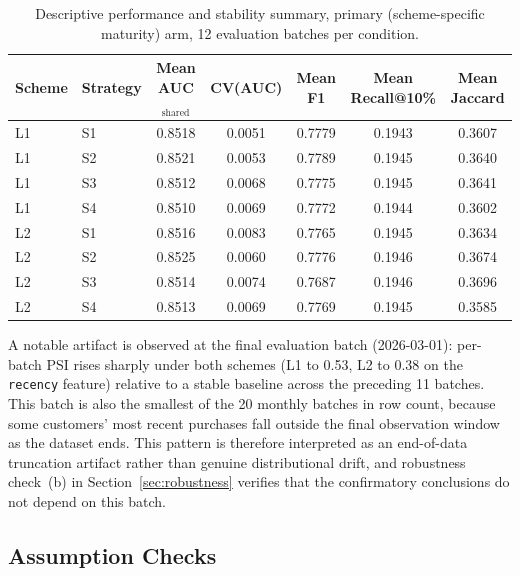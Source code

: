 \begin{table}[htbp]
  \centering
  \footnotesize
  \begin{tabular}{l l c c c c c}
    \toprule
    Scheme & Strategy & Mean AUC$_{\text{shared}}$ & CV(AUC) & Mean F1 & Mean Recall@10\% & Mean Jaccard \\
    \midrule
    L1 & S1 & 0.8518 & 0.0051 & 0.7779 & 0.1943 & 0.3607 \\
    L1 & S2 & 0.8521 & 0.0053 & 0.7789 & 0.1945 & 0.3640 \\
    L1 & S3 & 0.8512 & 0.0068 & 0.7775 & 0.1945 & 0.3641 \\
    L1 & S4 & 0.8510 & 0.0069 & 0.7772 & 0.1944 & 0.3602 \\
    L2 & S1 & 0.8516 & 0.0083 & 0.7765 & 0.1945 & 0.3634 \\
    L2 & S2 & 0.8525 & 0.0060 & 0.7776 & 0.1946 & 0.3674 \\
    L2 & S3 & 0.8514 & 0.0074 & 0.7687 & 0.1946 & 0.3696 \\
    L2 & S4 & 0.8513 & 0.0069 & 0.7769 & 0.1945 & 0.3585 \\
    \bottomrule
  \end{tabular}
  \caption{Descriptive performance and stability summary, primary (scheme-specific maturity) arm, 12 evaluation batches per condition.}
  \label{tab:descriptive-primary}
\end{table}

A notable artifact is observed at the final evaluation batch (2026-03-01): per-batch PSI rises sharply under both schemes (L1 to 0.53, L2 to 0.38 on the \texttt{recency} feature) relative to a stable baseline across the preceding 11 batches. This batch is also the smallest of the 20 monthly batches in row count, because some customers' most recent purchases fall outside the final observation window as the dataset ends. This pattern is therefore interpreted as an end-of-data truncation artifact rather than genuine distributional drift, and robustness check~(b) in Section~\ref{sec:robustness} verifies that the confirmatory conclusions do not depend on this batch.

\subsection{Assumption Checks}

